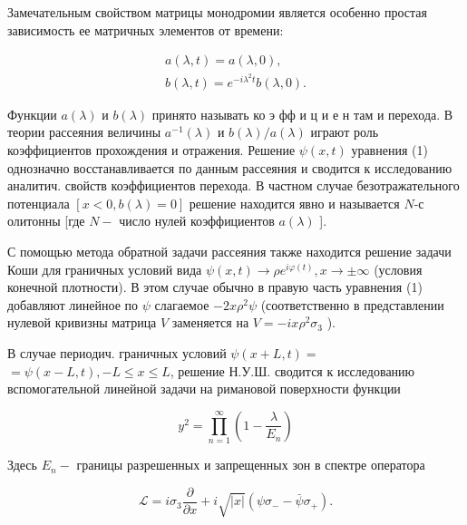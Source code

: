 \documentclass[10pt]{article}
\begin{document}
Замечательным свойством матрицы монодромии является особенно простая зависимость ее матричных элементов от времени:



\[

\begin{gathered}

a(\lambda, t)=a(\lambda, 0), \\

b(\lambda, t)=e^{-i \lambda^{2} t} b(\lambda, 0) .

\end{gathered}

\]



Функции $a(\lambda)$ и $b(\lambda)$ принято называть ко э фф и ц и е н там и перехода. В теории рассеяния величины $a^{-1}(\lambda)$ и $b(\lambda) / a(\lambda)$ играют роль коэффициентов прохождения и отражения. Решение $\psi(x, t)$ уравнения (1) однозначно восстанавливается по данным рассеяния и сводится к исследованию аналитич. свойств коэффициентов перехода. В частном случае безотражательного потенциала $[x<0, b(\lambda)=0]$ решение находится явно и называется $N$-с олитонны [где $N-$ число нулей коэффициентов $a(\lambda)$ ].



С помощью метода обратной задачи рассеяния также находится решение задачи Коши для граничных условий вида $\psi(x, t) \rightarrow \rho e^{i \varphi(t)}, x \rightarrow \pm \infty$ (условия конечной плотности). В этом случае обычно в правую часть уравнения (1) добавляют линейное по $\psi$ слагаемое $-2 x \rho^{2} \psi$ (соответственно в представлении нулевой кривизны матрица $V$ заменяется на $V=-i x \rho^{2} \sigma_{3}$ ).



В случае периодич. граничных условий $\psi(x+L, t)=$ $=\psi(x-L, t),-L \leqslant x \leqslant L$, решение Н.У.Ш. сводится к исследованию вспомогательной линейной задачи на римановой поверхности функции



\[

y^{2}=\prod_{n=1}^{\infty}\left(1-\frac{\lambda}{E_{n}}\right)

\]



Здесь $E_{n}-$ границы разрешенных и запрещенных зон в спектре оператора



\[

\mathscr{L}=i \sigma_{3} \frac{\partial}{\partial x}+i \sqrt{|x|}\left(\psi \sigma_{-}-\bar{\psi} \sigma_{+}\right) .

\]
\end{document}

